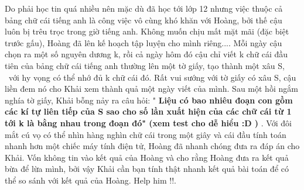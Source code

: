 Do phải học tin quá nhiều nên mặc dù đã học tới lớp 12 nhưng việc thuộc cả bảng chữ cái tiếng anh là công việc vô cùng khó khăn với Hoàng, bởi thế cậu luôn bị trêu trọc trong giờ tiếng anh. Không muốn chịu mất mặt mãi (đặc biệt trước gấu), Hoàng đã lên kế hoạch tập luyện cho mình riêng.... Mỗi ngày cậu chọn ra một số nguyên dương k, rồi cả ngày hôm đó cậu chỉ viết k chữ cái đầu tiên của bảng chữ cái tiếng anh thường lên một tờ giấy, tạo thành một xâu S,  với hy vọng có thể nhớ đủ k chữ cái đó. Rất vui sướng với tờ giấy có xâu S, cậu liền đem nó cho Khải xem thành quả một ngày viết của mình. Sau một hồi ngắm nghía tờ giấy, Khải bỗng nảy ra câu hỏi: "   \textbf{    Liệu có bao nhiêu đoạn con gồm các kí tự liên tiếp của S sao cho số lần xuất hiện của các chữ cái từ 1 tới k là bằng nhau trong đoạn đó" (xem test cho dễ hiểu :D )   }   . Với đôi mắt cú vọ có thể nhìn hàng nghìn chữ cái trong một giây và cái đầu tính toán nhanh hơn một chiếc máy tính điện tử, Hoàng đã nhanh chóng đưa ra đáp án cho Khải. Vốn không tin vào kết quả của Hoàng và cho rằng Hoàng đưa ra kết quả bừa để lừa mình, bởi vậy Khải cần bạn tính thật nhanh kết quả bài toán để có thể so sánh với kết quả của Hoàng. Help him !!.